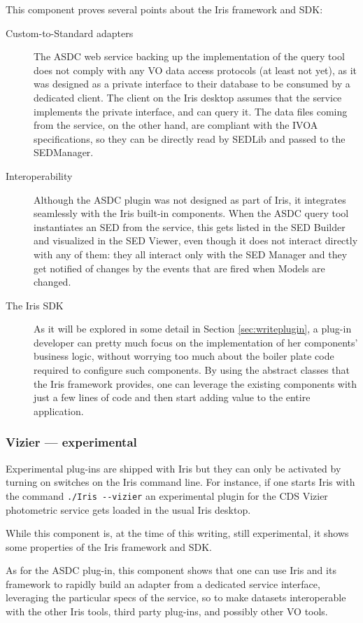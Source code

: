 \documentclass[final,5p,authoryear]{elsarticle}
\begin{document}
This component proves several points about the Iris framework and SDK:
\begin{description} \item[Custom-to-Standard adapters] The ASDC web service
backing up the implementation of the query tool does not comply with any VO data
access protocols (at least not yet), as it was designed as a private interface
to their database to be consumed by a dedicated client. The client on the Iris
desktop assumes that the service implements the private interface, and can query
it. The data files coming from the service, on the other hand, are compliant
with the IVOA specifications, so they can be directly read by SEDLib and passed
to the SEDManager.  \item[Interoperability] Although the ASDC plugin was not
designed as part of Iris, it integrates seamlessly with the Iris built-in
components. When the ASDC query tool instantiates an SED from the service, this
gets listed in the SED Builder and visualized in the SED Viewer, even though it
does not interact directly with any of them: they all interact only with the SED
Manager and they get notified of changes by the events that are fired when
Models are changed.  \item[The Iris SDK] As it will be explored in some detail
in Section \ref{sec:writeplugin}, a plug-in developer can pretty much focus on
the implementation of her components' business logic, without worrying too much
about the boiler plate code required to configure such components. By using the
abstract classes that the Iris framework provides, one can leverage the existing
components with just a few lines of code and then start adding value to the
entire application.  \end{description}

\subsubsection{Vizier --- experimental} \label{sec:asdc} Experimental plug-ins
are shipped with Iris but they can only be activated by turning on switches on
the Iris command line. For instance, if one starts Iris with the command
\verb|./Iris --vizier| an experimental plugin for the CDS Vizier photometric
service gets loaded in the usual Iris desktop.

While this component is, at the time of this writing, still experimental, it
shows some properties of the Iris framework and SDK.

As for the ASDC plug-in, this component shows that one can use Iris and its
framework to rapidly build an adapter from a dedicated service interface,
leveraging the particular specs of the service, so to make datasets
interoperable with the other Iris tools, third party plug-ins, and possibly
other VO tools.
\end{document}
